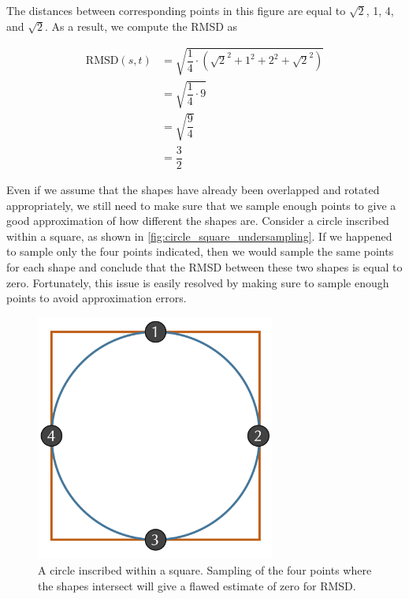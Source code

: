 The distances between corresponding points in this figure are equal to $\sqrt{2}$, 1, 4, and $\sqrt{2}$. As a result, we compute the RMSD as

\begin{align*}
	\text{RMSD}(s, t) &= \sqrt{\dfrac{1}{4} \cdot (\sqrt{2}^2 + 1^2 + 2^2 + \sqrt{2}^2)} \\
	&= \sqrt{\dfrac{1}{4} \cdot 9}\\
	&= \sqrt{\dfrac{9}{4}}\\
	&= \dfrac{3}{2}
\end{align*}


\begin{qbox}\end{qbox}

Even if we assume that the shapes have already been overlapped and rotated appropriately, we still need to make sure that we sample enough points to give a good approximation of how different the shapes are. Consider a circle inscribed within a square, as shown in \autoref{fig:circle_square_undersampling}. If we happened to sample only the four points indicated, then we would sample the same points for each shape and conclude that the RMSD between these two shapes is equal to zero. Fortunately, this issue is easily resolved by making sure to sample enough points to avoid approximation errors.

\begin{figure}[h]
	\centering
	\mySfFamily
	\includegraphics[width = 0.7\textwidth]{../images/circle_square_undersampling.png}
	\caption{A circle inscribed within a square. Sampling of the four points where the shapes intersect will give a flawed estimate of zero for RMSD.}
	\label{fig:circle_square_undersampling}
\end{figure}

